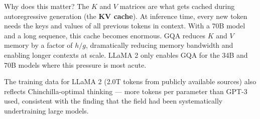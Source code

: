 Why does this matter? The $K$ and $V$ matrices are what gets cached during autoregressive generation (the \textbf{KV cache}). At inference time, every new token needs the keys and values of all previous tokens in context. With a 70B model and a long sequence, this cache becomes enormous. GQA reduces $K$ and $V$ memory by a factor of $h/g$, dramatically reducing memory bandwidth and enabling longer contexts at scale. LLaMA 2 only enables GQA for the 34B and 70B models where this pressure is most acute.

The training data for LLaMA 2 (2.0T tokens from publicly available sources) also reflects Chinchilla-optimal thinking --- more tokens per parameter than GPT-3 used, consistent with the finding that the field had been systematically undertraining large models.